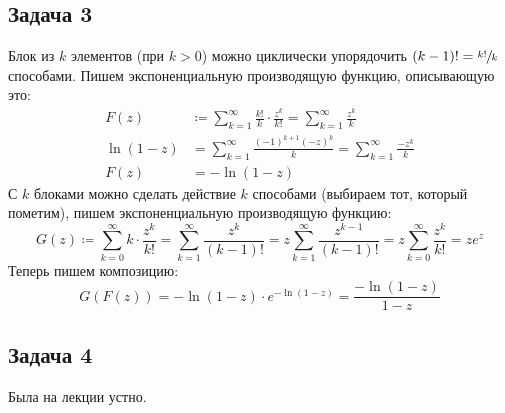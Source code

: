 \subsection{Задача 3}
	Блок из $k$ элементов (при $k>0$) можно циклически упорядочить $(k-1)!=\sfrac{k!}{k}$ способами.
	Пишем экспоненциальную производящую функцию, описывающую это:
	\begin{align*}
		F(z) &\coloneq \sum_{k=1}^\infty \frac{k!}{k} \cdot \frac{z^k}{k!} = \sum_{k=1}^\infty \frac{z^k}{k} \\
		\ln(1-z) &= \sum_{k=1}^\infty \frac{(-1)^{k+1}(-z)^k}{k} = \sum_{k=1}^\infty \frac{-z^k}{k} \\
		F(z) &= -\ln(1 - z)
	\end{align*}
	С $k$ блоками можно сделать действие $k$ способами (выбираем тот, который пометим), пишем экспоненциальную производящую функцию:
	\[
		G(z) \coloneq
		\sum_{k=0}^\infty k \cdot \frac{z^k}{k!} =
		\sum_{k=1}^\infty \frac{z^k}{(k-1)!} =
		z \sum_{k=1}^\infty \frac{z^{k-1}}{(k-1)!} =
		z \sum_{k=0}^\infty \frac{z^k}{k!} =
		ze^z
	\]
	Теперь пишем композицию:
	\[
		G(F(z)) = -\ln(1-z) \cdot e^{-\ln(1-z)} = \frac{-\ln(1-z)}{1-z}
	\]

\subsection{Задача 4}
	Была на лекции устно.

